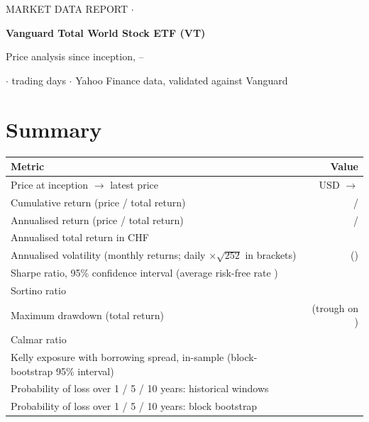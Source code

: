 \documentclass[11pt,a4paper]{article}
\begin{document}
\thispagestyle{fancy}
{%
{\footnotesize\color{muted}\MakeUppercase{Market data report} $\cdot$ }\par\vspace{0.6em}
{\fontsize{22}{26}\selectfont\bfseries\color{ink} Vanguard Total World Stock ETF (VT)\par}\vspace{0.3em}
{\large\color{muted} Price analysis since inception,  -- \par}\vspace{0.2em}
{\small\color{muted}  $\cdot$  trading days $\cdot$ Yahoo Finance data, validated against Vanguard\par}
}
\vspace{0.4em}

\section*{Summary}

\begin{table}[H]
\footnotesize
\begin{tabularx}{\linewidth}{L r}
\toprule
\textbf{Metric} & \textbf{Value} \\
\midrule
Price at inception $\rightarrow$ latest price & USD  $\rightarrow$  \\
Cumulative return (price / total return) &  /  \\
Annualised return (price / total return) &  /  \\
Annualised total return in CHF &  \\
Annualised volatility (monthly returns; daily $\times\sqrt{252}$ in brackets) &  () \\
Sharpe ratio, 95\% confidence interval (average risk-free rate ) &   \\
Sortino ratio &  \\
Maximum drawdown (total return) &  (trough on ) \\
Calmar ratio &  \\
Kelly exposure with borrowing spread, in-sample (block-bootstrap 95\% interval) &   \\
Probability of loss over 1 / 5 / 10 years: historical windows &  \\
Probability of loss over 1 / 5 / 10 years: block bootstrap &  \\
\bottomrule
\end{tabularx}
\end{table}
\end{document}
